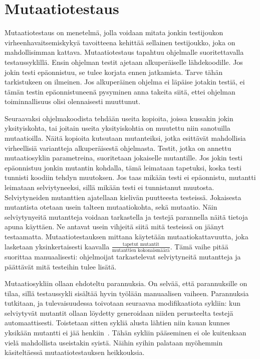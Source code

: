 \documentclass{tktltiki}
\begin{document}
\section{Mutaatiotestaus}
Mutaatiotestaus on menetelmä, jolla voidaan mitata jonkin testijoukon virheenhavaitsemiskykyä tavoitteena kehittää sellainen testijoukko, joka on mahdollisimman kattava. Mutaatiotestaus tapahtuu ohjelmalle suoritettavalla testaussyklillä. Ensin ohjelman testit ajetaan alkuperäiselle lähdekoodille. Jos jokin testi epäonnistuu, se tulee korjata ennen jatkamista. Tarve tähän tarkistukeen on ilmeinen. Jos alkuperäinen ohjelma ei läpäise jotakin testiä, ei tämän testin epäonnistuneenä pysyminen anna takeita siitä, ettei ohjelman toiminnallisuus olisi olennaisesti muuttunut.

Seuraavaksi ohjelmakoodista tehdään useita kopioita, joissa kussakin jokin yksityiskohta, tai joitain useita yksityiskohtia on muutettu niin sanotuilla mutaatioilla. Näitä kopioita kutsutaan mutanteiksi, jotka esittävät mahdollisia virheellisiä variantteja alkuperäisestä ohjelmasta. Testit, jotka on annettu mutaatiosyklin parametreina, suoritetaan jokaiselle mutantille. Jos jokin testi epäonnistuu jonkin mutantin kohdalla, tämä leimataan tapetuksi, koska testi tunnisti koodiin tehdyn muutoksen. Jos taas mikään testi ei epäonnistu, mutantti leimataan selviytyneeksi, sillä mikään testi ei tunnistanut muutosta. Selviytyneiden mutanttien ajatellaan kielivän puutteesta testeissä. Jokaisesta mutantista otetaan usein talteen mutaatiokohta, sekä mutaatio. Näin selviytynyeitä mutantteja voidaan tarkastella ja testejä parannella näitä tietoja apuna käyttäen. Ne antavat usein vihjeitä siitä mitä testeissä on jäänyt testaamatta. Mutaatiotestauksen mittana käytetään mutaatiokattavuutta, joka lasketaan yksinkertaisesti kaavalla $\frac{\text{tapetut mutantit}}{\text{mutanttien kokonaismäärä}}$. Tämä vaihe pitää suorittaa manuaalisesti: ohjelmoijat tarkastelevat selviytyneitä mutantteja ja päättävät mitä testeihin tulee lisätä.

Mutaatiosykliin ollaan ehdoteltu parannuksia. On selvää, että parannuksille on tilaa, sillä testaussykli sisältää hyvin työlään manuaalisen vaiheen. Parannuksia tutkitaan, ja tulevaisuudessa toivotaan seuraavaa modifikaatiota sykliin: kun selviytyvät mutantit ollaan löydetty generoidaan niiden perusteelta testejä automaattisesti. Toistetaan sitten sykliä alusta lähtien niin kauan kunnes yksikään mutantti ei jää henkiin~\cite{}. Tähän sykliin pääseminen ei ole kuitenkaan vielä mahdollista useistakin syistä. Näihin syihin palataan myöhemmin käsiteltäessä mutaatiotestauksen heikkouksia. 
\end{document}
